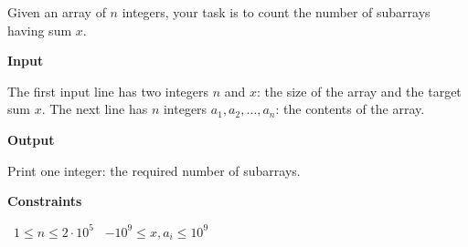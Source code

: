 Given an array of $n$ integers, your task is to count the number of subarrays having sum $x$.

\vspace{0.3cm}\noindent\textbf{Input}

The first input line has two integers $n$ and $x$: the size of the array and the target sum $x$.
The next line has $n$ integers $a_1,a_2,\dots,a_n$: the contents of the array.

\vspace{0.3cm}\noindent\textbf{Output}

Print one integer: the required number of subarrays.

\vspace{0.3cm}\noindent\textbf{Constraints}

\textbullet\ $1 \le n \le 2 \cdot 10^5$
\textbullet\ $-10^9 \le x,a_i \le 10^9$